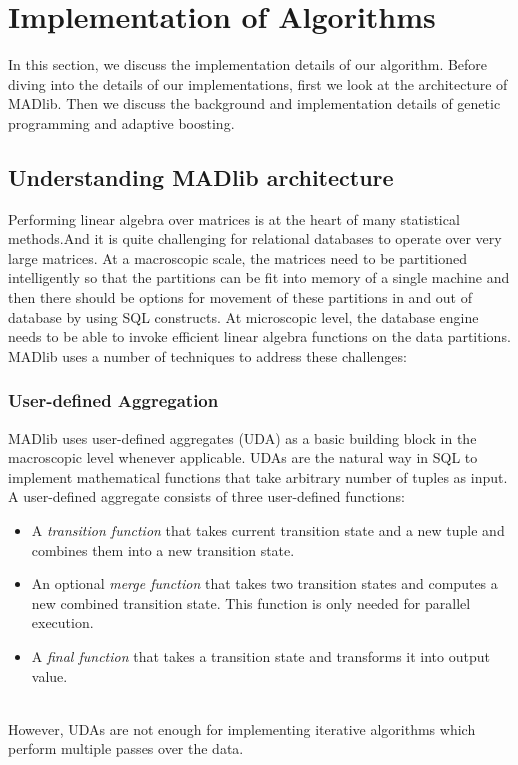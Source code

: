 \section{Implementation of Algorithms}
\label{sec:imp}
In this section, we discuss the implementation details of our algorithm. Before diving into the details of our implementations, first we look at the architecture of MADlib. Then we discuss the background and implementation details of genetic programming and adaptive boosting.

\subsection{Understanding MADlib architecture}
Performing linear algebra over matrices is at the heart of many statistical methods.And it is quite challenging for relational databases to operate over very large matrices. At a macroscopic scale, the matrices need to be partitioned intelligently so that the partitions can be fit into memory of a single machine and then there should be options for movement of these partitions in and out of database by using SQL constructs. At microscopic level, the database engine needs to be able to invoke efficient linear algebra functions on the data partitions. MADlib uses a number of techniques to address these challenges:

\subsubsection*{User-defined Aggregation}
MADlib uses user-defined aggregates (UDA) as a basic building block in the macroscopic level whenever applicable. UDAs are the natural way in SQL to implement mathematical functions that take arbitrary number of tuples as input. A user-defined aggregate consists of three user-defined functions:
\begin{itemize}
\item A {\it transition function} that takes current transition state and a new tuple and combines them into a new transition state.
\item An optional {\it merge function} that takes two transition states and computes a new combined transition state. This function is only needed for parallel execution.
\item A {\it final function} that takes a transition state and transforms it into output value.
\end{itemize}

~~\\
However, UDAs are not enough for implementing iterative algorithms which perform multiple passes over the data.

